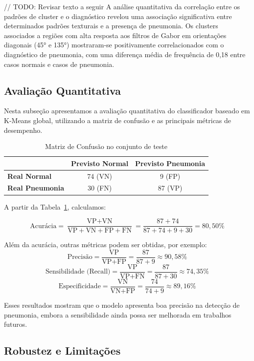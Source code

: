 \documentclass[sigconf,nonacm]{acmart}
\begin{document}
// TODO: Revisar texto a seguir
A análise quantitativa da correlação entre os padrões de cluster e o diagnóstico revelou uma associação significativa entre determinados padrões texturais e a presença de pneumonia. Os clusters associados a regiões com alta resposta aos filtros de Gabor em orientações diagonais (45° e 135°) mostraram-se positivamente correlacionados com o diagnóstico de pneumonia, com uma diferença média de frequência de 0,18 entre casos normais e casos de pneumonia.

\subsection{Avaliação Quantitativa}
Nesta subseção apresentamos a avaliação quantitativa do classificador baseado em K-Means global, utilizando a matriz de confusão e as principais métricas de desempenho.

\begin{table}[h]
  \centering
  \caption{Matriz de Confusão no conjunto de teste}
  \label{tab:confusion_matrix}
  \begin{tabular}{lcc}
    \toprule
                   & \textbf{Previsto Normal} & \textbf{Previsto Pneumonia} \\
    \midrule
    \textbf{Real Normal}     & 74 (VN)   & 9  (FP)  \\
    \textbf{Real Pneumonia}  & 30 (FN)   & 87 (VP)  \\
    \bottomrule
  \end{tabular}
\end{table}

A partir da Tabela~\ref{tab:confusion_matrix}, calculamos:

\[
\text{Acurácia} = \frac{\text{VP} + \text{VN}}{\text{VP} + \text{VN} + \text{FP} + \text{FN}}
= \frac{87 + 74}{87 + 74 + 9 + 30} = 80{,}50\%
\]

Além da acurácia, outras métricas podem ser obtidas, por exemplo:
\[
\text{Precisão} = \frac{\text{VP}}{\text{VP} + \text{FP}}
= \frac{87}{87 + 9} \approx 90{,}58\%
\]
\[
\text{Sensibilidade (Recall)} = \frac{\text{VP}}{\text{VP} + \text{FN}}
= \frac{87}{87 + 30} \approx 74{,}35\%
\]
\[
\text{Especificidade} = \frac{\text{VN}}{\text{VN} + \text{FP}}
= \frac{74}{74 + 9} \approx 89{,}16\%
\]

Esses resultados mostram que o modelo apresenta boa precisão na detecção de pneumonia, embora a sensibilidade ainda possa ser melhorada em trabalhos futuros.

\subsection{Robustez e Limitações}
\end{document}
